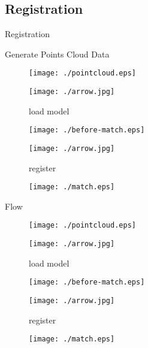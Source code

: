 \documentclass[xcolor=table,compress,blue]{beamer}
\begin{document}
\subsection{Registration}
\begin{frame}{Registration}
	\begin{exampleblock}{Generate Points Cloud Data}
		\begin{figure}[htpb]
			\centering
			\begin{minipage}[b]{0.8in}
				\centerline{ \texttt{[image: ./pointcloud.eps]} }
			\end{minipage}
			\begin{minipage}[b]{0.8in}
				\centerline{ \quad}
				\centerline{ \texttt{[image: ./arrow.jpg]} }
				\centerline{\tiny{load model}}
			\end{minipage}
			\begin{minipage}[b]{0.8in}
				\centerline{ \texttt{[image: ./before-match.eps]} }
			\end{minipage}
			\begin{minipage}[b]{0.8in}
				\centerline{ \texttt{[image: ./arrow.jpg]} }
				\centerline{\tiny{register}}
			\end{minipage}
			\begin{minipage}[b]{0.8in}
				\centerline{ \texttt{[image: ./match.eps]} }
			\end{minipage}
		\end{figure}
	\end{exampleblock}
	\begin{exampleblock}{Flow}
		\begin{figure}[htpb]
			\centering
			\begin{minipage}[b]{0.8in}
				\centerline{ \texttt{[image: ./pointcloud.eps]} }
			\end{minipage}
			\begin{minipage}[b]{0.8in}
				\centerline{ \quad}
				\centerline{ \texttt{[image: ./arrow.jpg]} }
				\centerline{\tiny{load model}}
			\end{minipage}
			\begin{minipage}[b]{0.8in}
				\centerline{ \texttt{[image: ./before-match.eps]} }
			\end{minipage}
			\begin{minipage}[b]{0.8in}
				\centerline{ \texttt{[image: ./arrow.jpg]} }
				\centerline{\tiny{register}}
			\end{minipage}
			\begin{minipage}[b]{0.8in}
				\centerline{ \texttt{[image: ./match.eps]} }
			\end{minipage}
		\end{figure}
	\end{exampleblock}
\end{frame}
\end{document}
